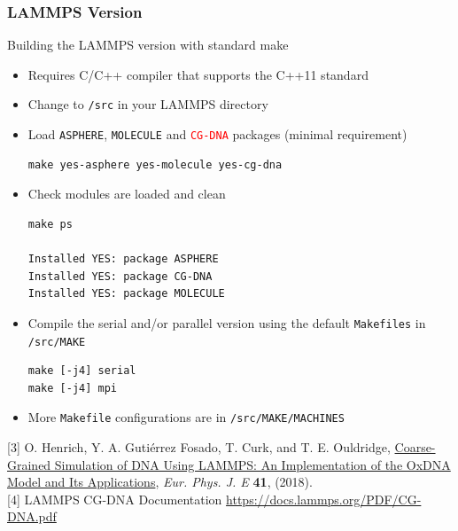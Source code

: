 \documentclass[slidestop,compress,9pt]{beamer}
\begin{document}
\begin{frame}[fragile]
\frametitle{LAMMPS Version}
\small 
Building the LAMMPS version with standard make
\begin{itemize}
\item Requires C/C++ compiler that supports the C++11 standard
\item Change to \texttt{/src} in your LAMMPS directory
\item Load \texttt{ASPHERE}, \texttt{MOLECULE} and \texttt{\textcolor{red}{CG-DNA}} packages (minimal requirement)\\
\linespread{0.4}
\begin{lstlisting}
make yes-asphere yes-molecule yes-cg-dna
\end{lstlisting}
\item Check modules are loaded and clean

\begin{lstlisting}
make ps

Installed YES: package ASPHERE
Installed YES: package CG-DNA
Installed YES: package MOLECULE
\end{lstlisting}

\item Compile the serial and/or parallel version using the default \texttt{Makefiles} in \texttt{/src/MAKE}
\begin{lstlisting}
make [-j4] serial
make [-j4] mpi
\end{lstlisting}
\item More \texttt{Makefile} configurations are in \texttt{/src/MAKE/MACHINES}
\end{itemize}
\linespread{1.0}\vspace*{0.25cm}
[3] O. Henrich, Y. A. Guti\'errez Fosado, T. Curk, and T. E. Ouldridge, \href{https://doi.org/10.1140/epje/i2018-11669-8}{Coarse-Grained Simulation of DNA Using LAMMPS: An Implementation of the OxDNA Model and Its Applications}, \textit{Eur. Phys. J. E} \textbf{41}, (2018).\\[3pt]
[4] LAMMPS CG-DNA Documentation \href{https://docs.lammps.org/PDF/CG-DNA.pdf}{https://docs.lammps.org/PDF/CG-DNA.pdf}
\end{frame}
\end{document}
